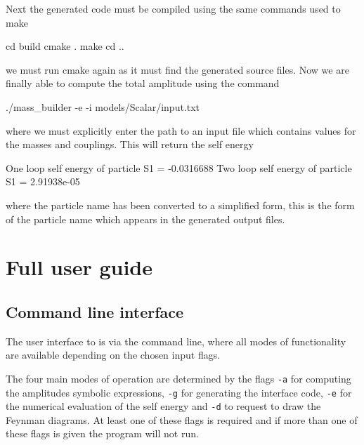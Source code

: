 Next the generated \CC code must be compiled using the same commands used to make \mb
\begin{lstterm}
cd build
cmake .
make
cd ..
\end{lstterm}
we must run cmake again as it must find the generated source files.
Now we are finally able to compute the total amplitude using the command
\begin{lstterm}
./mass_builder -e -i models/Scalar/input.txt
\end{lstterm}
where we must explicitly enter the path to an input file which contains values for the masses and couplings.  This will return the self energy
\begin{lstterm}
One loop self energy of particle S1 = -0.0316688
Two loop self energy of particle S1 = 2.91938e-05
\end{lstterm}
where the particle name has been converted to a simplified form, this is the form of the particle name which appears in the generated output files.

\section{Full user guide}\label{sec:user_guide}
\subsection{Command line interface}

The user interface to \mb is via the command line, where all modes of functionality are available depending on the chosen input flags.

The four main modes of operation are determined by the flags \lstinline{-a} for computing the amplitudes symbolic expressions, \lstinline{-g} for generating the \tsil interface code, \lstinline{-e} for the numerical evaluation of the self energy and \lstinline{-d} to request \feynarts to draw the Feynman diagrams.  At least one of these flags is required and if more than one of these flags is given the program will not run.


